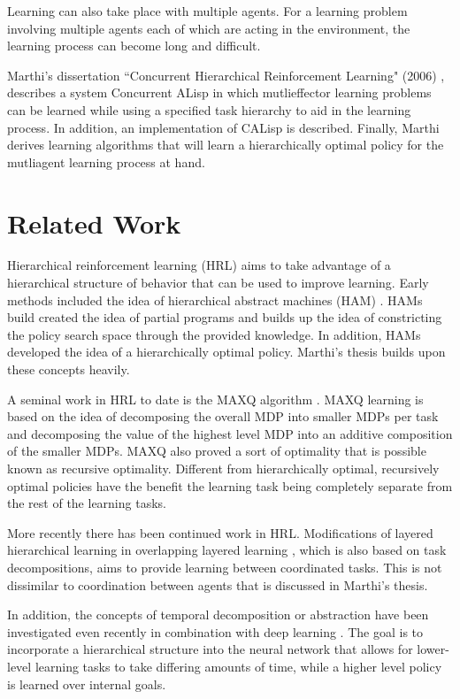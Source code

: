 \documentclass[jair,twoside,11pt,theapa]{article}
\begin{document}
Learning can also take place with multiple agents. For a learning problem involving multiple agents each of which are acting in the environment, the learning process can become long and difficult. 

Marthi's dissertation ``Concurrent Hierarchical Reinforcement Learning" (2006) \cite{Marthi:2006}, describes a system Concurrent ALisp in which mutlieffector learning problems can be learned while using a specified task hierarchy to aid in the learning process. In addition, an implementation of CALisp is described. Finally, Marthi derives learning algorithms that will learn a hierarchically optimal policy for the mutliagent learning process at hand.

\section{Related Work}
\label{Related Work}
Hierarchical reinforcement learning (HRL) aims to take advantage of a hierarchical structure of behavior that can be used to improve learning. Early methods included the idea of hierarchical abstract machines (HAM) \cite {Parr:1998}. HAMs build created the idea of partial programs and builds up the idea of constricting the policy search space through the provided knowledge. In addition, HAMs developed the idea of a hierarchically optimal policy. Marthi's thesis builds upon these concepts heavily. 

A seminal work in HRL to date is the MAXQ algorithm \cite{Dietterich:2000}. MAXQ learning is based on the idea of decomposing the overall MDP into smaller MDPs per task and decomposing the value of the highest level MDP into an additive composition of the smaller MDPs. MAXQ also proved a sort of optimality that is possible known as recursive optimality. Different from hierarchically optimal, recursively optimal policies have the benefit the learning task being completely separate from the rest of the learning tasks. 

More recently there has been continued work in HRL. Modifications of layered hierarchical learning in overlapping layered learning \cite{MacAlpine:2018}, which is also based on task decompositions, aims to provide learning between coordinated tasks. This is not dissimilar to coordination between agents that is discussed in Marthi's thesis. 

In addition, the concepts of temporal decomposition or abstraction have been investigated even recently in combination with deep learning \cite{Kulkarni:2016}. The goal is to incorporate a hierarchical structure into the neural network that allows for lower-level learning tasks to take differing amounts of time, while a higher level policy is learned over internal goals. 
\end{document}
